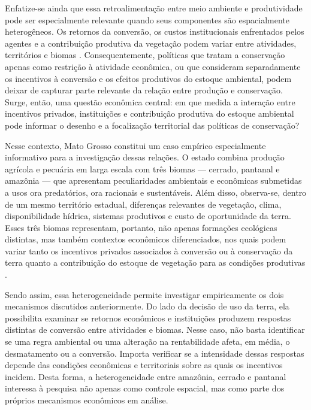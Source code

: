 Enfatize-se ainda que essa retroalimentação entre meio ambiente e produtividade pode ser especialmente relevante quando seus componentes são espacialmente heterogêneos. Os retornos da conversão, os custos institucionais enfrentados pelos agentes e a contribuição produtiva da vegetação podem variar entre atividades, territórios e biomas \cite{BradfordEtAl2006,UptonEtAl2014}. Consequentemente, políticas que tratam a conservação apenas como restrição à atividade econômica, ou que consideram separadamente os incentivos à conversão e os efeitos produtivos do estoque ambiental, podem deixar de capturar parte relevante da relação entre produção e conservação. Surge, então, uma questão econômica central: em que medida a interação entre incentivos privados, instituições e contribuição produtiva do estoque ambiental pode informar o desenho e a focalização territorial das políticas de conservação? %

Nesse contexto, Mato Grosso constitui um caso empírico especialmente informativo para a investigação dessas relações. O estado combina produção agrícola e pecuária em larga escala com três biomas — cerrado, pantanal e amazônia — que apresentam peculiaridades ambientais e econômicas submetidas a usos ora predatórios, ora racionais e sustentáveis. Além disso, observa-se, dentro de um mesmo território estadual, diferenças relevantes de vegetação, clima, disponibilidade hídrica, sistemas produtivos e custo de oportunidade da terra. Esses três biomas representam, portanto, não apenas formações ecológicas distintas, mas também contextos econômicos diferenciados, nos quais podem variar tanto os incentivos privados associados à conversão ou à conservação da terra quanto a contribuição do estoque de vegetação para as condições produtivas \cite{VanWeyEtAl2013,SimoesEtAl2020}. %

Sendo assim, essa heterogeneidade permite investigar empiricamente os dois mecanismos discutidos anteriormente. Do lado da decisão de uso da terra, ela possibilita examinar se retornos econômicos e instituições produzem respostas distintas de conversão entre atividades e biomas. Nesse caso, não basta identificar se uma regra ambiental ou uma alteração na rentabilidade afeta, em média, o desmatamento ou a conversão. Importa verificar se a intensidade dessas respostas depende das condições econômicas e territoriais sobre as quais os incentivos incidem. Desta forma, a heterogeneidade entre amazônia, cerrado e pantanal interessa à pesquisa não apenas como controle espacial, mas como parte dos próprios mecanismos econômicos em análise.

